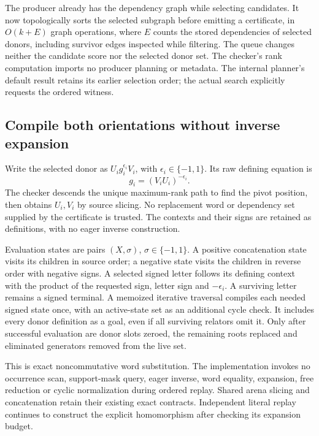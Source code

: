 The producer already has the dependency graph while selecting candidates.
It now topologically sorts the selected subgraph before emitting a certificate,
in $O(k+E)$ graph operations, where $E$ counts the stored dependencies
of selected donors, including survivor edges inspected while filtering.
The queue changes neither the candidate score nor the selected donor set.
The checker's rank computation imports no producer planning or metadata.
The internal planner's default result retains its earlier selection order;
the actual search explicitly requests the ordered witness.

\subsection{Compile both orientations without inverse expansion}

Write the selected donor as $U_i g_i^{\epsilon_i}V_i$, with
$\epsilon_i\in\{-1,1\}$. Its raw defining equation is
\[
 g_i=(V_iU_i)^{-\epsilon_i}.
\]
The checker descends the unique maximum-rank path to find the pivot position,
then obtains $U_i,V_i$ by source slicing. No replacement word or dependency
set supplied by the certificate is trusted. The contexts and their signs
are retained as definitions, with no eager inverse construction.

Evaluation states are pairs $(X,\sigma)$, $\sigma\in\{-1,1\}$.
A positive concatenation state visits its children in source order; a
negative state visits the children in reverse order with negative signs.
A selected signed letter follows its defining context with the product of
the requested sign, letter sign and $-\epsilon_i$. A surviving letter remains
a signed terminal. A memoized iterative traversal compiles each needed signed
state once, with an active-state set as an additional cycle check. It includes
every donor definition as a goal, even if all surviving relators omit it.
Only after successful evaluation are donor slots zeroed, the remaining roots
replaced and eliminated generators removed from the live set.

This is exact noncommutative word substitution. The implementation invokes no
occurrence scan, support-mask query, eager inverse, word equality, expansion,
free reduction or cyclic normalization during ordered replay. Shared arena
slicing and concatenation retain their existing exact contracts. Independent
literal replay continues to construct the explicit homomorphism after checking
its expansion budget.

